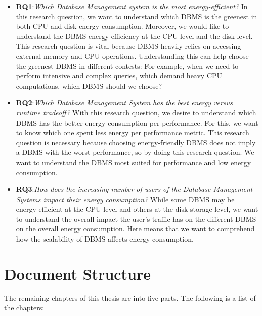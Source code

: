 \begin{itemize}
  \item \textbf{RQ1}:\textit{Which Database Management system is the most energy-efficient?}
In this research question, we want to understand which DBMS is the greenest in both CPU and disk energy consumption. Moreover, we would like to understand the DBMS energy efficiency at the CPU level and the disk level. This research question is vital because DBMS heavily relies on accessing external memory and CPU operations. Understanding this can help choose the greenest DBMS in different contests: For example, when we need to perform intensive and complex queries, which demand heavy CPU computations, which DBMS should we choose?

 \item \textbf{RQ2}:\textit{Which Database Management System has the best energy versus runtime tradeoff?}
With this research question, we desire to understand which DBMS has the better energy consumption per performance. For this, we want to know which one spent less energy per performance metric. This research question is necessary because choosing energy-friendly DBMS does not imply a DBMS with the worst performance, so by doing this research question. We want to understand the DBMS most suited for performance and low energy consumption.
 
 
  \item \textbf{RQ3}:\textit{How does the increasing number of users of the Database Management Systems impact their energy consumption? } While some DBMS may be energy-efficient at the CPU level and others at the disk storage level, we want to understand the overall impact the user's traffic has on the different DBMS on the overall energy consumption. Here means that we want to comprehend how the scalability of DBMS affects energy consumption.
\end{itemize}

\section{Document Structure}
\label{sc:structure}

The remaining chapters of this thesis are into five parts. The following is a list of the chapters: 


